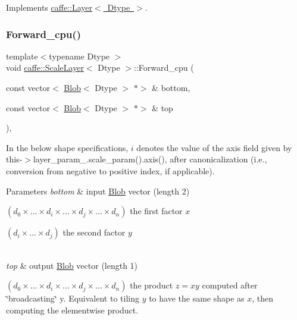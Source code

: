 Implements \mbox{\hyperlink{classcaffe_1_1_layer_a576ac6a60b1e99fe383831f52a6cea77}{caffe\+::\+Layer$<$ Dtype $>$}}.

\mbox{\label{classcaffe_1_1_scale_layer_a517d8eb2816c79daa1454ef5c7de065b}} 
\subsubsection{\texorpdfstring{Forward\+\_\+cpu()}{Forward\_cpu()}\hspace{0.1cm}{\footnotesize\ttfamily [2/2]}}
{\footnotesize\ttfamily template$<$typename Dtype $>$ \\
void \mbox{\hyperlink{classcaffe_1_1_scale_layer}{caffe\+::\+Scale\+Layer}}$<$ Dtype $>$\+::Forward\+\_\+cpu (\begin{DoxyParamCaption}\item[{const vector$<$ \mbox{\hyperlink{classcaffe_1_1_blob}{Blob}}$<$ Dtype $>$ $\ast$$>$ \&}]{bottom,  }\item[{const vector$<$ \mbox{\hyperlink{classcaffe_1_1_blob}{Blob}}$<$ Dtype $>$ $\ast$$>$ \&}]{top }\end{DoxyParamCaption})\hspace{0.3cm}{\ttfamily [protected]}, {\ttfamily [virtual]}}

In the below shape specifications, $ i $ denotes the value of the {\ttfamily axis} field given by {\ttfamily this-\/$>$layer\+\_\+param\+\_\+.\+scale\+\_\+param().axis()}, after canonicalization (i.\+e., conversion from negative to positive index, if applicable).


\begin{DoxyParams}{Parameters}
{\em bottom} & input \mbox{\hyperlink{classcaffe_1_1_blob}{Blob}} vector (length 2)
\begin{DoxyEnumerate}
\item $ (d_0 \times ... \times d_i \times ... \times d_j \times ... \times d_n) $ the first factor $ x $
\item $ (d_i \times ... \times d_j) $ the second factor $ y $ 
\end{DoxyEnumerate}\\
\hline
{\em top} & output \mbox{\hyperlink{classcaffe_1_1_blob}{Blob}} vector (length 1)
\begin{DoxyEnumerate}
\item $ (d_0 \times ... \times d_i \times ... \times d_j \times ... \times d_n) $ the product $ z = x y $ computed after \char`\"{}broadcasting\char`\"{} y. Equivalent to tiling $ y $ to have the same shape as $ x $, then computing the elementwise product. 
\end{DoxyEnumerate}\\
\hline
\end{DoxyParams}


